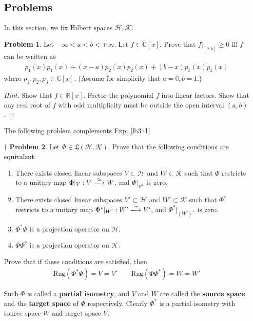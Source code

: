 \documentclass[12pt,b5paper,notitlepage]{article}
\theoremstyle{definition}
\newtheorem{prob}{\color{red}Problem}[section]
\newtheorem{dprob}[prob]{\color{red}$\dagger$ Problem}
\theoremstyle{plain}
\newcommand{\fk}{\mathfrak}
\newcommand{\ovl}{\overline}
\newcommand{\Cbb}{\mathbb C}
\newcommand{\Rbb}{\mathbb R}
\newcommand{\Rng}{\mathrm{Rng}}
\newcommand{\MH}{\mathcal H}
\newcommand{\MK}{\mathcal K}
\newcommand{\hqed}{\hfill\qedsymbol}
\numberwithin{equation}{section}
\begin{document}
\subsection{Problems}

In this section, we fix Hilbert spaces $\MH,\MK$.


\begin{prob}\label{lb284}
Let $-\infty<a<b<+\infty$. Let $f\in\Cbb[x]$. Prove that $f|_{[a,b]}\geq0$ iff $f$ can be written as
\begin{align*}
\ovl{p_1(x)}p_1(x)+(x-a)\ovl{p_2(x)}p_2(x)+(b-x)\ovl{p_3(x)}p_3(x)
\end{align*}
where $p_1,p_2,p_3\in\Cbb[x]$. (Assume for simplicity that $a=0,b=1$.)
\end{prob}

\begin{proof}[Hint]
Show that $f\in\Rbb[x]$. Factor the polynomial $f$ into linear factors. Show that any real root of $f$ with odd multiplicity must be outside the open interval $(a,b)$.
\end{proof}


The following problem complements Exp. \ref{lb311}.

\begin{dprob}\label{lb459}
Let $\Phi\in\fk L(\MH,\MK)$. Prove that the following conditions are equivalent:
\begin{enumerate}[label=(\arabic*)]
\item There exists closed linear subspaces $V\subset\MH$ and $W\subset\MK$ such that $\Phi$ restricts to a unitary map $\Phi|_V:V\xlongrightarrow{\simeq}W$, and $\Phi|_{V^\perp}$ is zero.
\item There exists closed linear subspaces $V'\subset\MH$ and $W'\subset\MK$ such that $\Phi^*$ restricts to a unitary map $\Phi^*|_{W'}:W'\xlongrightarrow{\simeq}V'$, and $\Phi^*|_{(W')^\perp}$ is zero.
\item $\Phi^*\Phi$ is a projection operator on $\MH$.
\item $\Phi\Phi^*$ is a projection operator on $\MK$.
\end{enumerate}
Prove that if these conditions are satisfied, then 
\begin{align}\label{eq240}
\Rng(\Phi^*\Phi)=V=V'\qquad \Rng(\Phi\Phi^*)=W=W'
\end{align}

Such $\Phi$ is called a \textbf{partial isometry}, and $V$ and $W$ are called the \textbf{source space}  and the \textbf{target space}  of $\Phi$ respectively. Clearly $\Phi^*$ is a partial isometry with source space $W$ and target space $V$.\hqed
\end{dprob}
\end{document}

